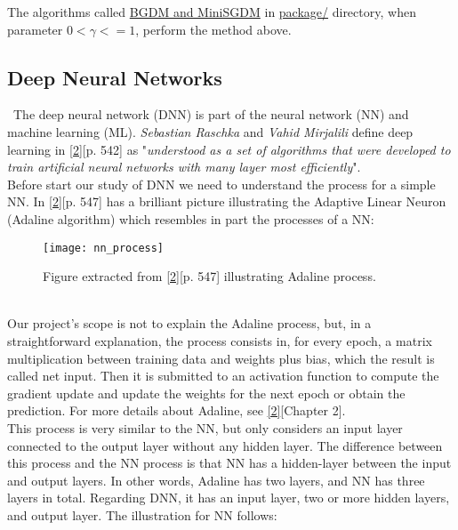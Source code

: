 The algorithms called \href{https://github.com/fabiorodp/UiO-FYS-STK4155/blob/master/Project2/package/gradient_descent.py}{BGDM and MiniSGDM} in \href{https://github.com/fabiorodp/UiO-FYS-STK4155/blob/master/Project2/package/}{package/} directory, when parameter $0 < \gamma <= 1$, perform the method above.\\


\subsection{Deep Neural Networks}
\label{chap:Deep Neural Networks}

\qquad \, The deep neural network (DNN) is part of the neural network (NN) and machine learning (ML). \textit{Sebastian Raschka} and \textit{Vahid Mirjalili} define deep learning in \hyperref[Bib:Python Machine Learning]{[2]}[p. 542] as "\textit{understood as a set of algorithms that were developed to train artificial neural networks with many layer most efficiently}".\\

Before start our study of DNN we need to understand the process for a simple NN. In \hyperref[Bib:Python Machine Learning]{[2]}[p. 547] has a brilliant picture illustrating the Adaptive Linear Neuron (Adaline algorithm) which resembles in part the processes of a NN:\\

\begin{figure}[H]
\label{fig:fig4}
\centering
\texttt{[image: nn\_process]}
\caption{Figure extracted from \hyperref[Bib:Python Machine Learning]{[2]}[p. 547] illustrating Adaline process.}
\end{figure}\\

Our project's scope is not to explain the Adaline process, but, in a straightforward explanation, the process consists in, for every epoch, a matrix multiplication between training data and weights plus bias, which the result is called net input. Then it is submitted to an activation function to compute the gradient update and update the weights for the next epoch or obtain the prediction. For more details about Adaline, see \hyperref[Bib:Python Machine Learning]{[2]}[Chapter 2].\\

This process is very similar to the NN, but only considers an input layer connected to the output layer without any hidden layer. The difference between this process and the NN process is that NN has a hidden-layer between the input and output layers. In other words, Adaline has two layers, and NN has three layers in total. Regarding DNN, it has an input layer, two or more hidden layers, and output layer. The illustration for NN follows:\\

